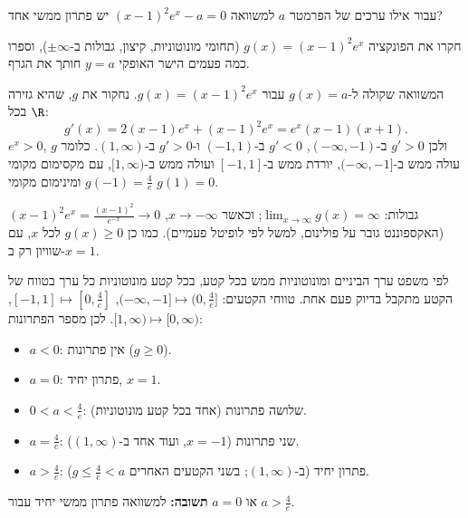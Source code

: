 
\begin{question}
עבור אילו ערכים של הפרמטר $a$ למשוואה $(x-1)^2e^x-a=0$ יש פתרון ממשי אחד?
\end{question}

\begin{hint}
חקרו את הפונקציה $g(x)=(x-1)^2e^x$ (תחומי מונוטוניות, קיצון, גבולות ב-$\pm\infty$), וספרו כמה פעמים הישר האופקי $y=a$ חותך את הגרף.
\end{hint}

\begin{solution}
המשוואה שקולה ל-$g(x)=a$ עבור $g(x)=(x-1)^2e^x$. נחקור את $g$, שהיא גזירה בכל $\R$:
\[ g'(x)=2(x-1)e^x+(x-1)^2e^x=e^x(x-1)(x+1). \]
$e^x>0$, ולכן $g'>0$ ב-$(-\infty,-1)$, $g'<0$ ב-$(-1,1)$ ו-$g'>0$ ב-$(1,\infty)$. כלומר $g$ עולה ממש ב-$(-\infty,-1]$, יורדת ממש ב-$[-1,1]$ ועולה ממש ב-$[1,\infty)$, עם מקסימום מקומי $g(-1)=\frac{4}{e}$ ומינימום מקומי $g(1)=0$.

גבולות: $\lim_{x\to\infty}g(x)=\infty$; וכאשר $x\to-\infty$, $(x-1)^2e^x=\frac{(x-1)^2}{e^{-x}}\to0$ (האקספוננט גובר על פולינום, למשל לפי לופיטל פעמיים). כמו כן $g(x)\ge0$ לכל $x$, עם שוויון רק ב-$x=1$.

לפי משפט ערך הביניים ומונוטוניות ממש בכל קטע, בכל קטע מונוטוניות כל ערך בטווח של הקטע מתקבל בדיוק פעם אחת. טווחי הקטעים: $(-\infty,-1]\mapsto(0,\frac4e]$, $[-1,1]\mapsto[0,\frac4e]$, $[1,\infty)\mapsto[0,\infty)$. לכן מספר הפתרונות:
\begin{itemize}
  \item $a<0$: אין פתרונות ($g\ge0$).
  \item $a=0$: פתרון יחיד, $x=1$.
  \item $0<a<\frac4e$: שלושה פתרונות (אחד בכל קטע מונוטוניות).
  \item $a=\frac4e$: שני פתרונות ($x=-1$, ועוד אחד ב-$(1,\infty)$).
  \item $a>\frac4e$: פתרון יחיד (ב-$(1,\infty)$; בשני הקטעים האחרים $g\le\frac4e<a$).
\end{itemize}
\textbf{תשובה:} למשוואה פתרון ממשי יחיד עבור $\boxed{a=0 \text{ או } a>\frac{4}{e}}$.
\end{solution}
